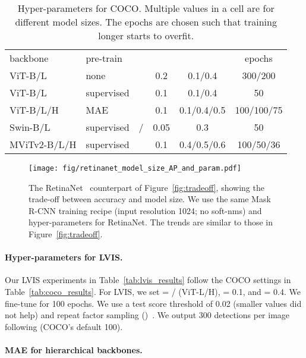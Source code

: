 \documentclass[runningheads]{llncs}
\begin{document}
\begin{table}[t]
    \begin{tabular}{llcccc}
    	backbone & pre-train & \lr & \wtd & \drp & epochs \\
    	\shline
    	ViT-B/L & none &  & 0.2 & 0.1/0.4 & 300/200 \\
    	ViT-B/L & supervised &  & 0.1 & 0.1/0.4 & 50 \\
    	ViT-B/L/H & MAE &  & 0.1 & 0.1/0.4/0.5 & 100/100/75 \\
    	\hline
    	Swin-B/L & supervised & / & 0.05 & 0.3 & 50 \\
    	MViTv2-B/L/H & supervised &  & 0.1 & 0.4/0.5/0.6 & 100/50/36
    \end{tabular}
    \vspace{.5em}
    \caption{Hyper-parameters for COCO. Multiple values in a cell are for different model sizes. The epochs are chosen such that training longer starts to overfit.
     \label{app:tab:hyper}
    }
\end{table}

\begin{figure}[t]\centering
\texttt{[image: fig/retinanet\_model\_size\_AP\_and\_param.pdf]}
\caption{The RetinaNet~\cite{Lin2017a} counterpart of Figure~\ref{fig:tradeoff}, showing the trade-off between accuracy and model size. We use the same Mask R-CNN training recipe (input resolution 1024; no soft-nms) and hyper-parameters for RetinaNet. The trends are similar to those in Figure~\ref{fig:tradeoff}.
\label{fig:retinanet_tradeoff}
}
\vspace{-1em}
\end{figure}

\paragraph{Hyper-parameters for LVIS.}
Our LVIS experiments in Table~\ref{tab:lvis_results} follow the COCO settings in Table~\ref{tab:coco_results}.
For LVIS, we set \lr = / (ViT-L/H), \wtd = 0.1, and \drp = 0.4. We fine-tune for 100 epochs. We use a test score threshold of 0.02 (smaller values did not help) and repeat factor sampling ()~\cite{Gupta2019}. We output  300 detections per image following \cite{Gupta2019} (\vs COCO's default 100).

\paragraph{MAE for hierarchical backbones.}
\end{document}
